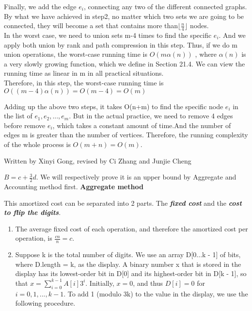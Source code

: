 \documentclass[11pt, answers]{exam}
\newcommand\floor[1]{\lfloor#1\rfloor}
\theoremstyle{plain}
\theoremstyle{definition}
\begin{document}
\begin{questions}
\begin{solution}
\begin{enumerate}
  Finally, we add the edge $e_i$, connecting any two of the different connected graphs. By what we have achieved in step2, no matter which two sets we are going to be connected, they will become a set that contains more than$\floor{\frac{n}{4}}$ nodes.\\
  In the worst case, we need to union sets m-4 times to find the specific $e_i$. And we apply both union by rank and path compression in this step. Thus, if we do m union operations, the worst-case running time is $O(m\alpha (n))$ , where $\alpha (n)$ is a very slowly growing function, which we define in Section 21.4. We can view the running time as linear in m in all practical situations.\\
  Therefore, in this step, the worst-case running time is  $O((m-4)\alpha (n)) = O(m-4) = O(m)$  \\
\end{enumerate}
Adding up the above two steps, it takes O(n+m) to find the specific node $e_i$ in the list of $ e_1,e_2,...,e_m $. But in the actual practice, we need to remove 4 edges before remove $e_i$, which takes a constant amount of time.And the number of edges m is greater than the number of vertices. Therefore, the running complexity of the whole process is $O(m+n) = O(m)$.


\end{solution}

\question
\begin{solution}Written by Xinyi Gong, revised by Ci Zhang and Junjie Cheng

$B = c + {\frac{3}{2}}d$. \newline
We will respectively prove it is an upper bound by Aggregate and Accounting method first.\newline
\newline
\textbf{Aggregate method}

This amortized cost can be separated into 2 parts. The \textbf{\emph{fixed cost}} and the \textbf{\emph{cost to flip the digits}}.

\begin{enumerate}

\item
The average fixed cost of each operation, and therefore the amortized cost per operation, is $\frac{cn}{n} = c$.
\item
Suppose k is the total number of digits. 
We use an array D[0...k - 1] of bits, where D.length = k, as the display. A binary number x that is stored in the display has its lowest-order bit in D[0] and its highest-order bit in D[k - 1], so that $x = \sum_{i=0}^{k-1} A[i]3^i$. Initially, $x = 0$, and thus $D[i] = 0$ for $i = 0, 1,..., k - 1$. To add 1 (modulo 3k) to the value in the display, we use the following procedure.


\end{enumerate}
\end{solution}
\end{questions}
\end{document}
